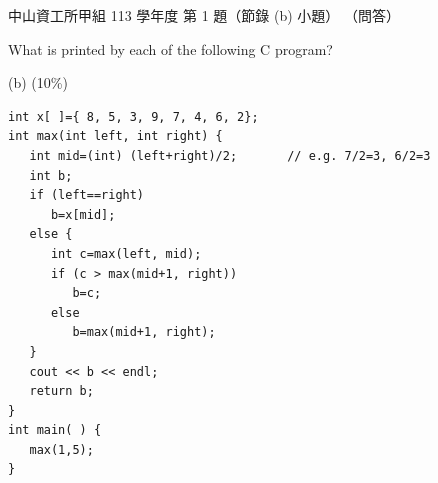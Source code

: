 \begin{pastexam}[label={px:nsysu-113-osds-01}]{中山資工所甲組 113 學年度 第 1 題（節錄 (b) 小題）}
（問答）

What is printed by each of the following C program?

(b) (10\%)
\begin{verbatim}
int x[ ]={ 8, 5, 3, 9, 7, 4, 6, 2};
int max(int left, int right) {
   int mid=(int) (left+right)/2;       // e.g. 7/2=3, 6/2=3
   int b;
   if (left==right)
      b=x[mid];
   else {
      int c=max(left, mid);
      if (c > max(mid+1, right))
         b=c;
      else
         b=max(mid+1, right);
   }
   cout << b << endl;
   return b;
}
int main( ) {
   max(1,5);
}
\end{verbatim}
\end{pastexam}

